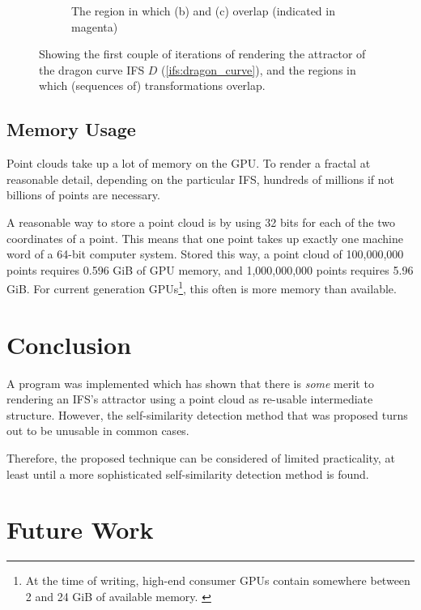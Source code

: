 \documentclass[11pt]{article}
\begin{document}
\begin{enumerate}
\begin{figure}
\begin{subfigure}[b]{0.4\textwidth}
         \caption{The region in which (b) and (c) overlap (indicated in magenta)}
         \label{figure:dragon_curve_d}
     \end{subfigure}
        \caption{Showing the first couple of iterations of rendering the attractor of the dragon curve IFS $D$ (\autoref{ifs:dragon_curve}), and the regions in which (sequences of) transformations overlap.}
        \label{figure:dragon_curve_overlaps}
\end{figure}
\end{enumerate}


\subsection{Memory Usage}
\label{sec:orgf5d2945}

Point clouds take up a lot of memory on the GPU. To render a fractal at reasonable detail, depending on the particular IFS,
hundreds of millions if not billions of points are necessary.

A reasonable way to store a point cloud is by using 32 bits for each of the two coordinates of a point. 
This means that one point takes up exactly one machine word of a 64-bit computer system.
Stored this way, a point cloud of 100,000,000 points requires 0.596 GiB of GPU memory,
and 1,000,000,000 points requires 5.96 GiB.
For current generation GPUs\footnote{At the time of writing, high-end consumer GPUs contain somewhere between 2 and 24 GiB of available memory. \cite{ign2020topgpus}}, this often is more memory than available.

\section{Conclusion}
\label{sec:org56d19a9}
\label{section:conclusion}

A program was implemented which has shown that there is \emph{some} merit to rendering an IFS's attractor using a point cloud as re-usable intermediate structure.
However, the self-similarity detection method that was proposed turns out to be unusable in common cases.

Therefore, the proposed technique can be considered of limited practicality, 
at least until a more sophisticated self-similarity detection method is found.

\section{Future Work}
\label{sec:orgd2bca6d}
\label{section:further_work}
\end{document}
